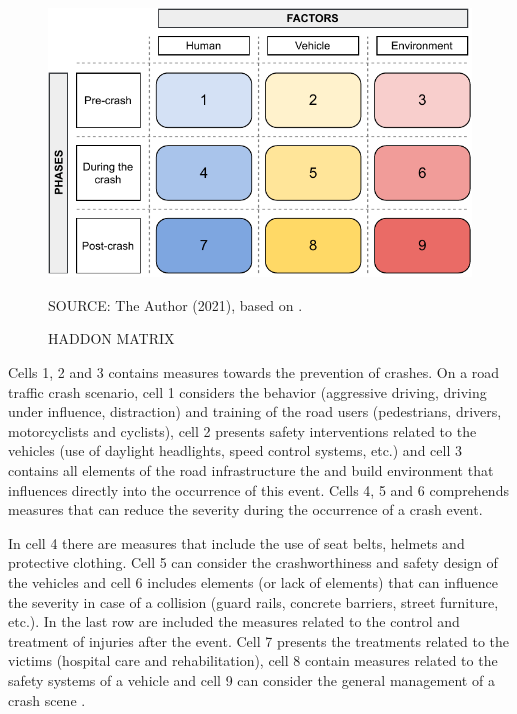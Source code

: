 \begin{figure}[!htbp]
    \centering\footnotesize
    \captionsetup{font=footnotesize}
    \caption{HADDON MATRIX}
    \includegraphics{fig/haddon.pdf}
    \label{fig:haddon}
    \par SOURCE: The Author (2021), based on \textcite{Haddon1980}.
\end{figure} 

Cells 1, 2 and 3 contains measures towards the prevention of crashes. On a road traffic crash scenario, cell 1 considers the behavior (aggressive driving, driving under influence, distraction) and training of the road users (pedestrians, drivers, motorcyclists and cyclists), cell 2 presents safety interventions related to the vehicles (use of daylight headlights, speed control systems, etc.) and cell 3 contains all elements of the road infrastructure the and build environment that influences directly into the occurrence of this event. Cells 4, 5 and 6 comprehends measures that can reduce the severity during the occurrence of a crash event.

In cell 4 there are measures that include the use of seat belts, helmets and protective clothing. Cell 5 can consider the crashworthiness and safety design of the vehicles and cell 6 includes elements (or lack of elements) that can influence the severity in case of a collision (guard rails, concrete barriers, street furniture, etc.). In the last row are included the measures related to the control and treatment of injuries after the event. Cell 7 presents the treatments related to the victims (hospital care and rehabilitation), cell 8 contain measures related to the safety systems of a vehicle and cell 9 can consider the general management of a crash scene \cite{Mohan2016}. 

